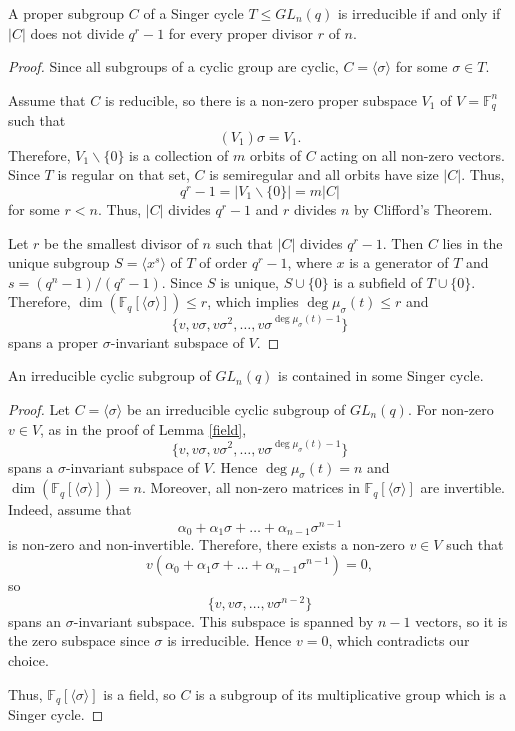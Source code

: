 \begin{Lem}\label{irrsub}
A proper subgroup $C$ of a Singer cycle $T \le GL_n(q)$ is irreducible if and only if $|C|$ does not divide $q^r-1$ for every proper divisor $r$ of $n$. 
\end{Lem}
\begin{proof}
Since all subgroups of a cyclic group are cyclic, $C=\langle \sigma \rangle$ for some $\sigma \in T.$

Assume that $C$ is reducible, so there is a non-zero proper  subspace $V_1$ of $V=\mathbb{F}_q^n$ such that $$(V_1)\sigma=V_1.$$ Therefore, $V_1 \backslash \{0\}$ is a collection of $m$ orbits of $C$ acting on all non-zero vectors. Since $T$ is regular on that set, $C$ is semiregular and all orbits have size $|C|.$ Thus, $$q^r-1 =|V_1 \backslash \{0\}|=m|C|$$ for some  $r<n$. Thus, $|C|$ divides $q^r-1$ and $r$ divides $n$ by Clifford's Theorem. 

Let $r$ be the smallest divisor of $n$ such that $|C|$ divides $q^r-1.$ Then $C$ lies in the unique subgroup $S=\langle x^s \rangle$ of $T$ of order $q^r-1$, where $x$ is a generator of $T$ and $s=(q^n-1)/(q^r-1).$ Since $S$ is  unique, $S \cup \{0\}$ is a subfield of $T \cup \{0\}$. Therefore, $\dim (\mathbb{F}_q[\langle \sigma \rangle]) \le r$, which implies $\deg \mu_{\sigma}(t) \le r$ and  
$$\{v,v\sigma,v\sigma^2, \ldots, v\sigma^{\deg{\mu_{\sigma}(t)}-1}\}$$
spans a proper $\sigma$-invariant subspace of $V.$
\end{proof}



\begin{Lem}\label{semis}
An irreducible cyclic subgroup  of $GL_n(q)$ is  contained in some Singer cycle. %
\end{Lem}
\begin{proof}
Let $C=\langle \sigma \rangle$ be an irreducible cyclic subgroup  of $GL_n(q)$. For  non-zero $v \in V$,  as in the proof of Lemma \ref{field}, $$\{v,v\sigma,v\sigma^2, \ldots, v\sigma^{\deg{\mu_{\sigma}(t)}-1}\}$$
spans a $\sigma$-invariant subspace of $V.$ Hence $\deg{\mu_{\sigma}(t)}=n$ and
$\dim (\mathbb{F}_q[\langle \sigma \rangle])=n.$   Moreover, all non-zero matrices in $\mathbb{F}_q[\langle \sigma \rangle]$ are invertible. Indeed,
assume that $$\alpha_0 + \alpha_1 \sigma + \ldots + \alpha_{n-1}\sigma^{n-1}$$
is non-zero and non-invertible. Therefore, there exists a non-zero $v \in V$ such that 
$$v(\alpha_0 + \alpha_1 \sigma + \ldots + \alpha_{n-1}\sigma^{n-1})=0,$$
so $$\{v, v \sigma, \ldots , v\sigma^{n-2}\}$$ 
spans an $\sigma$-invariant subspace. This subspace is spanned by $n-1$ vectors, so it is the zero subspace since $\sigma$ is irreducible. Hence $v=0$, which  contradicts  our choice.   


Thus, $\mathbb{F}_q[\langle \sigma \rangle]$ is a field, so $C$ is a subgroup of its multiplicative group which is a Singer cycle.
\end{proof}

